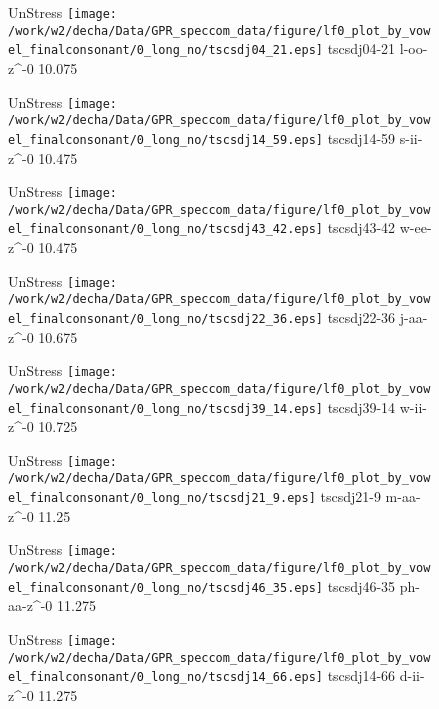 \documentclass{article}
\begin{document}
\begin{figure}[t]
\begin{minipage}[b]{.24\textwidth}
UnStress
\centering
\texttt{[image: /work/w2/decha/Data/GPR\_speccom\_data/figure/lf0\_plot\_by\_vowel\_finalconsonant/0\_long\_no/tscsdj04\_21.eps]}
tscsdj04-21 l-oo-z\textasciicircum-0 10.075
\end{minipage}
\begin{minipage}[b]{.24\textwidth}
UnStress
\centering
\texttt{[image: /work/w2/decha/Data/GPR\_speccom\_data/figure/lf0\_plot\_by\_vowel\_finalconsonant/0\_long\_no/tscsdj14\_59.eps]}
tscsdj14-59 s-ii-z\textasciicircum-0 10.475
\end{minipage}
\begin{minipage}[b]{.24\textwidth}
UnStress
\centering
\texttt{[image: /work/w2/decha/Data/GPR\_speccom\_data/figure/lf0\_plot\_by\_vowel\_finalconsonant/0\_long\_no/tscsdj43\_42.eps]}
tscsdj43-42 w-ee-z\textasciicircum-0 10.475
\end{minipage}
\begin{minipage}[b]{.24\textwidth}
UnStress
\centering
\texttt{[image: /work/w2/decha/Data/GPR\_speccom\_data/figure/lf0\_plot\_by\_vowel\_finalconsonant/0\_long\_no/tscsdj22\_36.eps]}
tscsdj22-36 j-aa-z\textasciicircum-0 10.675
\end{minipage}
\end{figure}
\clearpage
\begin{figure}[t]
\begin{minipage}[b]{.24\textwidth}
UnStress
\centering
\texttt{[image: /work/w2/decha/Data/GPR\_speccom\_data/figure/lf0\_plot\_by\_vowel\_finalconsonant/0\_long\_no/tscsdj39\_14.eps]}
tscsdj39-14 w-ii-z\textasciicircum-0 10.725
\end{minipage}
\begin{minipage}[b]{.24\textwidth}
UnStress
\centering
\texttt{[image: /work/w2/decha/Data/GPR\_speccom\_data/figure/lf0\_plot\_by\_vowel\_finalconsonant/0\_long\_no/tscsdj21\_9.eps]}
tscsdj21-9 m-aa-z\textasciicircum-0 11.25
\end{minipage}
\begin{minipage}[b]{.24\textwidth}
UnStress
\centering
\texttt{[image: /work/w2/decha/Data/GPR\_speccom\_data/figure/lf0\_plot\_by\_vowel\_finalconsonant/0\_long\_no/tscsdj46\_35.eps]}
tscsdj46-35 ph-aa-z\textasciicircum-0 11.275
\end{minipage}
\begin{minipage}[b]{.24\textwidth}
UnStress
\centering
\texttt{[image: /work/w2/decha/Data/GPR\_speccom\_data/figure/lf0\_plot\_by\_vowel\_finalconsonant/0\_long\_no/tscsdj14\_66.eps]}
tscsdj14-66 d-ii-z\textasciicircum-0 11.275
\end{minipage}
\end{figure}
\end{document}
